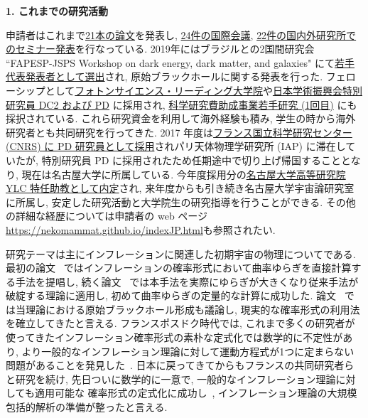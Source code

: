 \documentclass[11pt,a4paper,uplatex,dvipdfmx]{ujarticle} 		%
\newcommand{\研究課題名}{確率解析・原始ブラックホール・重力波観測から迫るインフレーション}
\newcommand{\研究機関名}{名古屋大学}
\newcommand{\研究代表者氏名}{多田祐一郎}
\newcommand{\研究期間の最終元号年度}{6}  %
\begin{document}

\begin{mdframed}[roundcorner=0.5zw,
	innertopmargin=0.8zw,innerbottommargin=0.8zw,
	linecolor=black!50,linewidth=0.2zw,
	backgroundcolor=black!10]
	{\bfseries\gtfamily\sffamily\large 1. これまでの研究活動}
\end{mdframed}

\noindent
申請者はこれまで\ul{21本の論文}を発表し, \ul{24件の国際会議}, \ul{22件の国内外研究所でのセミナー発表}を行なっている.
2019年にはブラジルとの2国間研究会 ``FAPESP-JSPS Workshop on dark energy, dark matter, and galaxies"
にて\ul{若手代表発表者として選出}され, 原始ブラックホールに関する発表を行った.
フェローシップとして\ul{フォトンサイエンス・リーディング大学院}や\ul{日本学術振興会特別研究員 DC2 および PD} に採用され,
\ul{科学研究費助成事業若手研究 (1回目)} にも採択されている.
これら研究資金を利用して海外経験も積み, 学生の時から海外研究者とも共同研究を行ってきた. 
2017 年度は\ul{フランス国立科学研究センター (CNRS) に PD 研究員として採用}されパリ天体物理学研究所 (IAP) に滞在していたが, 
特別研究員 PD に採用されたため任期途中で切り上げ帰国することとなり, 現在は名古屋大学に所属している.
今年度採用分の\ul{名古屋大学高等研究院 YLC 特任助教として内定}され, 来年度からも引き続き名古屋大学宇宙論研究室に所属し,
安定した研究活動と大学院生の研究指導を行うことができる.
その他の詳細な経歴については申請者の web ページ \url{https://nekomammat.github.io/indexJP.html}も参照されたい.

研究テーマは主にインフレーションに関連した初期宇宙の物理についてである.
最初の論文~\cite{Fujita:2013cna} ではインフレーションの確率形式において曲率ゆらぎを直接計算する手法を提唱し,
続く論文~\cite{Fujita:2014tja} では本手法を実際にゆらぎが大きくなり従来手法が破綻する理論に適用し, 初めて曲率ゆらぎの定量的な計算に成功した.
論文~\cite{Kawasaki:2015ppx} では当理論における原始ブラックホール形成も議論し, 現実的な確率形式の利用法を確立してきたと言える.
フランスポスドク時代では, これまで多くの研究者が使ってきたインフレーション確率形式の素朴な定式化では数学的に不定性があり,
より一般的なインフレーション理論に対して運動方程式が1つに定まらない問題があることを発見した~\cite{Pinol:2018euk}.
日本に戻ってきてからもフランスの共同研究者らと研究を続け, 先日ついに数学的に一意で, 一般的なインフレーション理論に対しても適用可能な
確率形式の定式化に成功し~\cite{Pinol:2020cdp}, インフレーション理論の大規模包括的解析の準備が整ったと言える.
\end{document}
